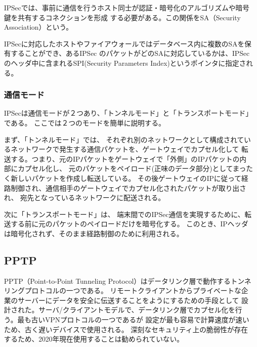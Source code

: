\documentclass[11pt,a4j,titlepage]{jreport}
\begin{document}
IPSecでは、事前に通信を行うホスト同士が認証・暗号化のアルゴリズムや暗号鍵を共有するコネクションを形成
する必要がある。この関係をSA（Security Association）という。\par
IPSecに対応したホストやファイアウォールではデータベース内に複数のSAを保有することができ、あるIPSec
のパケットがどのSAに対応しているかは、IPSecのヘッダ中に含まれるSPI(Security Parameters Index)というポインタに指定される。
\par 
\subsubsection*{通信モード}
IPSecは通信モードが２つあり、「トンネルモード」と「トランスポートモード」である。
ここでは２つのモードを簡単に説明する。

まず、「トンネルモード」では、
    それぞれ別のネットワークとして構成されているネットワークで発生する通信パケットを、ゲートウェイでカプセル化して
    転送する。つまり、元のIPパケットをゲートウェイで「外側」のIPパケットの内部にカプセル化し、
    元のパケットをペイロード(正味のデータ部分)としてまったく新しいパケットを作成し転送している。
    その後ゲートウェイのIPに従って経路制御され、通信相手のゲートウェイでカプセル化されたパケットが取り出され、
    宛先となっているネットワークに配送される。

次に「トランスポートモード」は、
端末間でのIPSec通信を実現するために、転送する前に元のパケットのペイロードだけを暗号化する。
このとき、IPヘッダは暗号化されず、そのまま経路制御のために利用される。


\subsection{PPTP}
PPTP（Point-to-Point Tunneling Protocol）\cite{RFC2637}はデータリンク層で動作するトンネリングプロトコルの一つである。
リモートクライアントからプライベートな企業のサーバーにデータを安全に伝送することをようにするための手段として
設計された。サーバ/クライアントモデルで、データリンク層でカプセル化を行う。最も古いVPNプロトコルの一つであるが
設定が最も容易で計算速度が速いため、古く遅いデバイスで使用される。
深刻なセキュリティ上の脆弱性が存在するため、2020年現在使用することは勧められていない。
\end{document}

